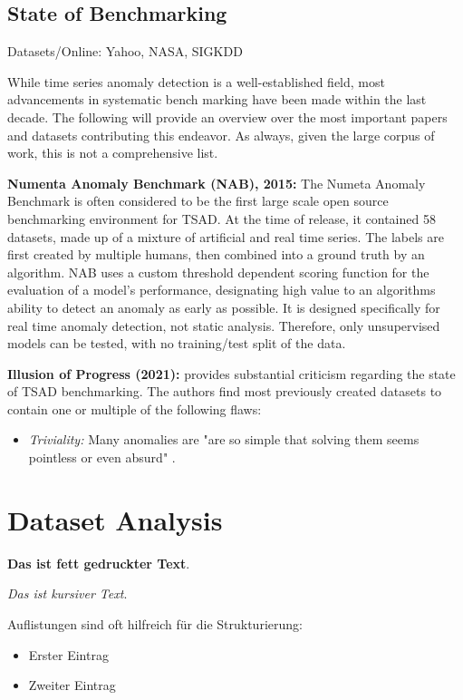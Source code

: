 \documentclass[12pt,oneside]{article}
\begin{document}
\textbf{}


\subsection{State of Benchmarking}

Datasets/Online: Yahoo, NASA, SIGKDD

While time series anomaly detection is a well-established field, most advancements in systematic bench marking have been made within the last decade. The following will provide an overview over the most important papers and datasets contributing this endeavor. As always, given the large corpus of work, this is not a comprehensive list.  \par
\textbf{Numenta Anomaly Benchmark (NAB), 2015:} The Numeta Anomaly Benchmark is often considered to be the first large scale open source benchmarking environment for TSAD. At the time of release, it contained 58 datasets, made up of a mixture of artificial and real time series. The labels are first created by multiple humans, then combined into a ground truth by an algorithm. NAB uses a custom threshold dependent scoring function for the evaluation of a model's performance, designating high value to an algorithms ability to detect an anomaly as early as possible. It is designed specifically for real time anomaly detection, not static analysis. Therefore, only unsupervised models can be tested, with no training/test split of the data.\par
\textbf{Illusion of Progress (2021):} \cite{wu2021current} provides substantial criticism regarding the state of TSAD benchmarking. The authors find most previously created datasets to contain one or multiple of the following flaws:
\begin{itemize}
    \item \textit{Triviality:} Many anomalies are "are so simple that solving them seems pointless or even absurd" \parencites[p.~2]{wu2021current}.
\end{itemize}


\section{Dataset Analysis}

\textbf{Das ist fett gedruckter Text}.

\textit{Das ist kursiver Text}.


Auflistungen sind oft hilfreich für die Strukturierung:
\begin{itemize}
    \item Erster Eintrag
    \item Zweiter Eintrag
\end{itemize}
\end{document}
